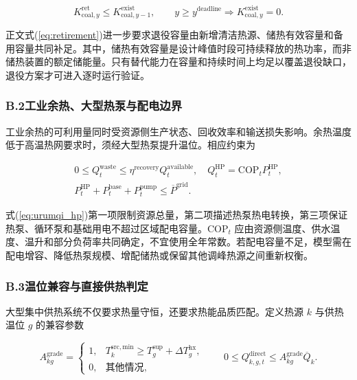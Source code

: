 \begin{equation}
K_{\mathrm{coal},y}^{\mathrm{ret}}\leq K_{\mathrm{coal},y-1}^{\mathrm{exist}},
\qquad
y\geq y^{\mathrm{deadline}}\Rightarrow K_{\mathrm{coal},y}^{\mathrm{exist}}=0.
\label{eq:urumqi_retirement_stage}
\end{equation}

正文式(\ref{eq:retirement})进一步要求退役容量由新增清洁热源、储热有效容量和备用容量共同补足。其中，储热有效容量是设计峰值时段可持续释放的热功率，而非储热装置的额定储能量。只有替代能力在容量和持续时间上均足以覆盖退役缺口，退役方案才可进入逐时运行验证。

\subsubsection*{B.2\quad 工业余热、大型热泵与配电边界}

工业余热的可利用量同时受资源侧生产状态、回收效率和输送损失影响。余热温度低于高温热网要求时，须经大型热泵提升温位。相应约束为

\begin{equation}
\begin{gathered}
0\leq Q_t^{\mathrm{waste}}\leq\eta^{\mathrm{recovery}}Q_t^{\mathrm{available}},
\quad
Q_t^{\mathrm{HP}}=\mathrm{COP}_tP_t^{\mathrm{HP}},
\\[1mm]
P_t^{\mathrm{HP}}+P_t^{\mathrm{base}}+P_t^{\mathrm{pump}}\leq\overline P^{\mathrm{grid}}.
\end{gathered}
\label{eq:urumqi_hp}
\end{equation}

式(\ref{eq:urumqi_hp})第一项限制资源总量，第二项描述热泵热电转换，第三项保证热泵、循环泵和基础用电不超过区域配电容量。$\mathrm{COP}_t$ 应由资源侧温度、供水温度、温升和部分负荷率共同确定，不宜使用全年常数。若配电容量不足，模型需在配电增容、降低热泵规模、增配储热或保留其他调峰热源之间重新权衡。

\subsubsection*{B.3\quad 温位兼容与直接供热判定}

大型集中供热系统不仅要求热量守恒，还要求热能品质匹配。定义热源 $k$ 与供热温位 $g$ 的兼容参数

\begin{equation}
A_{kg}^{\mathrm{grade}}=
\begin{cases}
1,&T_k^{\mathrm{src,min}}\geq T_g^{\mathrm{sup}}+\Delta T_g^{\mathrm{hx}},\\
0,&\text{其他情况},
\end{cases}
\qquad
0\leq Q_{k,g,t}^{\mathrm{direct}}\leq A_{kg}^{\mathrm{grade}}\overline Q_k.
\label{eq:urumqi_grade}
\end{equation}

